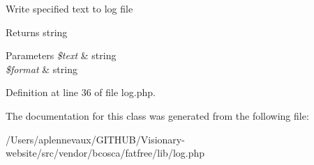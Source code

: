Write specified text to log file \begin{DoxyReturn}{Returns}
string 
\end{DoxyReturn}

\begin{DoxyParams}{Parameters}
{\em \$text} & string \\
\hline
{\em \$format} & string \\
\hline
\end{DoxyParams}


Definition at line 36 of file log.\+php.



The documentation for this class was generated from the following file\+:\begin{DoxyCompactItemize}
\item 
/\+Users/aplennevaux/\+G\+I\+T\+H\+U\+B/\+Visionary-\/website/src/vendor/bcosca/fatfree/lib/log.\+php\end{DoxyCompactItemize}
